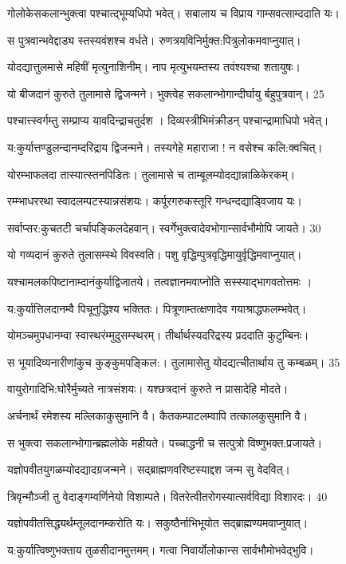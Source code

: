 गोलोकेसकलान्भुक्त्वा पश्चात्द्भूम्यधिपो भवेत्।
सबालाय च विप्राय गाम्सवत्साम्ददाति यः।

स पुत्रवान्भवेद्दाड्य स्तस्यवंशश्च वर्धते।
रुणत्रयविनिर्मुक्त:पित्रुलोकमवाप्नुयात्।

योदद्यात्तुलमासे महिषीं मृत्युनाशिनीम्।
नाप मृत्युभयम्तस्य तवंश्यश्चा शतायुषः।

यो बीजदानं कुरुते तुलामासे द्विजन्मने।
भुक्त्वेह सकलान्भोगान्दीर्घायु र्बहुपुत्रवान्। 25

पश्चात्त्स्वर्गम्तु सम्प्राप्य यावदिन्द्राचतुर्दश ।
दिव्यस्त्रीभिमंक्रीडन् पश्चान्द्रामाधिपो भवेत्।

य:कुर्यात्तण्डुलन्दानम्दरिद्राय द्विजन्मने।
तस्यगेहे महाराजा ! न वसेश्च कलि:क्वचित्।

योरम्भाफलदा तास्यात्स्तनपिडितः।
तुलामासे च ताम्बूलम्योदद्यान्नाळिकेरकम्।

रम्म्भाधररथा स्वादलम्पटस्यान्नसंशयः।
कर्पूरगरुकस्तूरि गन्धन्दद्याड्विजाय यः।

सर्वाप्सर:कुचतटी चर्चापङ्किलदेहवान्।
स्वर्गेभुक्त्वादेवभोगान्सार्वभौमोपि जायते। 30

यो गव्यदानं कुरुते तुलासम्स्थे विवस्वति।
पशु वृद्धिम्पुत्रवृद्धिमायुर्वृद्धिमवाप्नुयात्।

यश्चामलकपिष्टानाम्दानंकुर्याद्विजातये।
तत्वज्ञानमवाप्नोति सस्स्याद्भागवतोत्तमः ।

य:कुर्यात्तिलदानम्वै पिचूनुद्धिश्य भक्तितः।
पित्रूणाम्तत्क्षणादेव गयाश्राद्धफलम्भवेत्।

योमञ्चमुपधानम्वा स्वास्थरंम्मुदुसम्स्थरम्।
तीर्थार्थस्यदरिद्रस्य प्रददाति कुटुम्बिनः।

स भूयादिव्यनारीणांकुच कुङ्कुमपङ्किल:।
तुलामासेतु योदद्यत्चीतार्थाय तु कम्बळम्। 35

वायुरोगादिभि:घोरैर्मुच्यते नात्रसंशयः।
यश्छत्रदानं कुरुते न प्रासादेहि मोदते।

अर्चनार्थं रमेशस्य मल्लिकाकुसुमानि वै।
कैतकम्पाटलम्वापि तत्कालकुसुमानि वै।

स भुक्त्वा सकलान्भोगान्ब्रह्मलोके महीयते।
पच्चाद्धनी च सत्पुत्रो विष्णुभक्त:प्रजायते।

यज्ञोपवीतयुगळम्योदद्यादग्रजन्मने।
सद्ब्राह्मणवरिष्टस्याद्दश जन्म सु वेदवित्।

त्रिवृन्मौञ्जी तु वेदाङ्गम्वर्णिनेयो विशाम्पते।
वितरेत्वीतरोगस्यात्सर्वविद्या विशारदः। 40


यज्ञोपवीतसिद्ध्यर्थम्तूलदानम्करोति यः।
सकुष्ठैर्नाभिभूयोत सद्ब्राह्मण्यमवाप्नुयात्।

य:कुर्यात्विष्णुभक्ताय तुळसीदानमुत्तमम्।
गत्वा निवार्योलोकान्स सार्वभौमोभवेद्भुवि।


